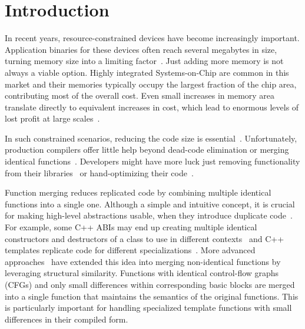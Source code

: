 \section{Introduction}
\label{sec:introduction}

In recent years, resource-constrained devices have become increasingly
important. Application binaries for these devices often reach several megabytes
in size, turning memory size into a limiting factor~\cite{plaza18}. Just adding more
memory is not always a viable option. Highly integrated Systems-on-Chip are
common in this market and their memories typically occupy the largest fraction
of the chip area, contributing most of the overall cost. Even small
increases in memory area translate directly to equivalent increases in cost,
which lead to enormous levels of lost profit at large scales~\cite{edler10}.

In such constrained scenarios, reducing the code size is essential~\cite{schultz03,varma04,sehgal12,keoh14,auler17}.
Unfortunately, production compilers offer little help beyond dead-code
elimination or merging identical functions~\cite{tallam10,kwan12,livska14}.
Developers might have more luck just removing functionality from their
libraries~\cite{keoh14} or hand-optimizing their code~\cite{weaver09}.


Function merging reduces replicated code by combining multiple identical
functions into a single one. 
Although a simple and intuitive concept, it is crucial for making high-level
abstractions usable, when they introduce duplicate code~\cite{tallam10,kwan12}.
For example, some C++ ABIs may end up creating multiple identical constructors
and destructors of a class to use in different contexts~\cite{kwan12} and C++
templates replicate code for different specializations~\cite{tallam10,livska14}.
More advanced approaches~\cite{edler14} have extended this idea into
merging non-identical functions by leveraging structural similarity. Functions
with identical control-flow graphs (CFGs) and only small differences within
corresponding basic blocks are merged into a single function that maintains
the semantics of the original functions. This is particularly important for
handling specialized template functions with small differences in their
compiled form.

